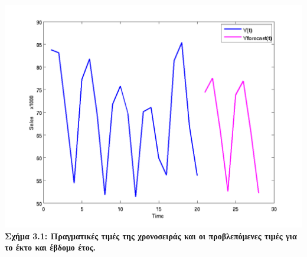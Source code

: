 \begin{center}
\includegraphics[scale=0.7]{graff7.png}\\   
\textbf{Σχήμα 3.1: Πραγματικές τιμές της χρονοσειράς και οι προβλεπόμενες τιμές για το έκτο και έβδομο έτος.}
\end{center}

